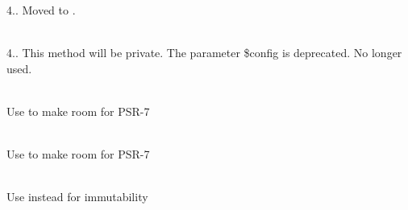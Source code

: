 \begin{DoxyRefList}
\label{deprecated__deprecated000072}%
%
4.. Moved to .  
\item[Member \doxylink{class_code_igniter_1_1_h_t_t_p_1_1_incoming_request_af97e2eda3c57243d6bc61fe49302f6e5}{Code\+Igniter\textbackslash{}HTTP\textbackslash{}Incoming\+Request\+::set\+Path} (string \$path, ?\doxylink{class_config_1_1_app}{App} \$config=null)]\hfill \\
\label{deprecated__deprecated000074}%
%
4.. This method will be private. The parameter \$config is deprecated. No longer used.  
\item[Member \doxylink{class_code_igniter_1_1_h_t_t_p_1_1_message_a94b9aea731f4906181b84374eb54b192}{Code\+Igniter\textbackslash{}HTTP\textbackslash{}Message\+::get\+Header} (string \$name)]\hfill \\
\label{deprecated__deprecated000076}%
%
Use  to make room for PSR-\/7 
\item[Member \doxylink{class_code_igniter_1_1_h_t_t_p_1_1_message_a7ac779bec32597d4367aa736bc5d2551}{Code\+Igniter\textbackslash{}HTTP\textbackslash{}Message\+::get\+Headers} ()]\hfill \\
\label{deprecated__deprecated000075}%
%
Use  to make room for PSR-\/7 
\item[Member \doxylink{class_code_igniter_1_1_h_t_t_p_1_1_outgoing_request_ad42e98a4adc86d7ef6ba5a9543694ea1}{Code\+Igniter\textbackslash{}HTTP\textbackslash{}Outgoing\+Request\+::set\+Method} (string \$method)]\hfill \\
\label{deprecated__deprecated000077}%
%
Use  instead for immutability  
\item[Member \doxylink{class_code_igniter_1_1_h_t_t_p_1_1_request_a6f3a8de5e6f822d2a47851beae96c718}{Code\+Igniter\textbackslash{}HTTP\textbackslash{}Request\+::set\+Method} (string \$method)]\hfill \\
\label{deprecated__deprecated000078}%
%

\end{DoxyRefList}
